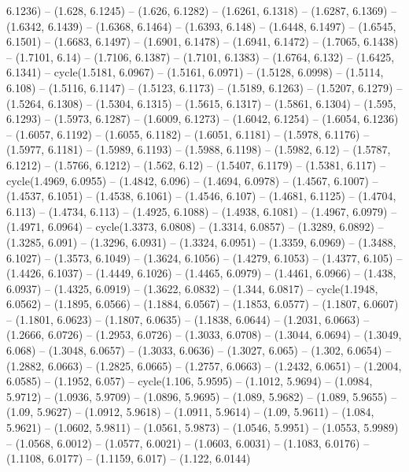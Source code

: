 {  6.1236) -- (1.628, 6.1245) -- (1.626, 6.1282) -- (1.6261, 6.1318) -- (1.6287, 
  6.1369) -- (1.6342, 6.1439) -- (1.6368, 6.1464) -- (1.6393, 6.148) -- (1.6448,
   6.1497) -- (1.6545, 6.1501) -- (1.6683, 6.1497) -- (1.6901, 6.1478) -- 
  (1.6941, 6.1472) -- (1.7065, 6.1438) -- (1.7101, 6.14) -- (1.7106, 6.1387) -- 
  (1.7101, 6.1383) -- (1.6764, 6.132) -- (1.6425, 6.1341) -- cycle(1.5181, 
  6.0967) -- (1.5161, 6.0971) -- (1.5128, 6.0998) -- (1.5114, 6.108) -- (1.5116,
   6.1147) -- (1.5123, 6.1173) -- (1.5189, 6.1263) -- (1.5207, 6.1279) -- 
  (1.5264, 6.1308) -- (1.5304, 6.1315) -- (1.5615, 6.1317) -- (1.5861, 6.1304) 
  -- (1.595, 6.1293) -- (1.5973, 6.1287) -- (1.6009, 6.1273) -- (1.6042, 6.1254)
   -- (1.6054, 6.1236) -- (1.6057, 6.1192) -- (1.6055, 6.1182) -- (1.6051, 
  6.1181) -- (1.5978, 6.1176) -- (1.5977, 6.1181) -- (1.5989, 6.1193) -- 
  (1.5988, 6.1198) -- (1.5982, 6.12) -- (1.5787, 6.1212) -- (1.5766, 6.1212) -- 
  (1.562, 6.12) -- (1.5407, 6.1179) -- (1.5381, 6.117) -- cycle(1.4969, 6.0955) 
  -- (1.4842, 6.096) -- (1.4694, 6.0978) -- (1.4567, 6.1007) -- (1.4537, 6.1051)
   -- (1.4538, 6.1061) -- (1.4546, 6.107) -- (1.4681, 6.1125) -- (1.4704, 6.113)
   -- (1.4734, 6.113) -- (1.4925, 6.1088) -- (1.4938, 6.1081) -- (1.4967, 
  6.0979) -- (1.4971, 6.0964) -- cycle(1.3373, 6.0808) -- (1.3314, 6.0857) -- 
  (1.3289, 6.0892) -- (1.3285, 6.091) -- (1.3296, 6.0931) -- (1.3324, 6.0951) --
   (1.3359, 6.0969) -- (1.3488, 6.1027) -- (1.3573, 6.1049) -- (1.3624, 6.1056) 
  -- (1.4279, 6.1053) -- (1.4377, 6.105) -- (1.4426, 6.1037) -- (1.4449, 6.1026)
   -- (1.4465, 6.0979) -- (1.4461, 6.0966) -- (1.438, 6.0937) -- (1.4325, 
  6.0919) -- (1.3622, 6.0832) -- (1.344, 6.0817) -- cycle(1.1948, 6.0562) -- 
  (1.1895, 6.0566) -- (1.1884, 6.0567) -- (1.1853, 6.0577) -- (1.1807, 6.0607) 
  -- (1.1801, 6.0623) -- (1.1807, 6.0635) -- (1.1838, 6.0644) -- (1.2031, 
  6.0663) -- (1.2666, 6.0726) -- (1.2953, 6.0726) -- (1.3033, 6.0708) -- 
  (1.3044, 6.0694) -- (1.3049, 6.068) -- (1.3048, 6.0657) -- (1.3033, 6.0636) --
   (1.3027, 6.065) -- (1.302, 6.0654) -- (1.2882, 6.0663) -- (1.2825, 6.0665) --
   (1.2757, 6.0663) -- (1.2432, 6.0651) -- (1.2004, 6.0585) -- (1.1952, 6.057) 
  -- cycle(1.106, 5.9595) -- (1.1012, 5.9694) -- (1.0984, 5.9712) -- (1.0936, 
  5.9709) -- (1.0896, 5.9695) -- (1.089, 5.9682) -- (1.089, 5.9655) -- (1.09, 
  5.9627) -- (1.0912, 5.9618) -- (1.0911, 5.9614) -- (1.09, 5.9611) -- (1.084, 
  5.9621) -- (1.0602, 5.9811) -- (1.0561, 5.9873) -- (1.0546, 5.9951) -- 
  (1.0553, 5.9989) -- (1.0568, 6.0012) -- (1.0577, 6.0021) -- (1.0603, 6.0031) 
  -- (1.1083, 6.0176) -- (1.1108, 6.0177) -- (1.1159, 6.017) -- (1.122, 6.0144) 
}
